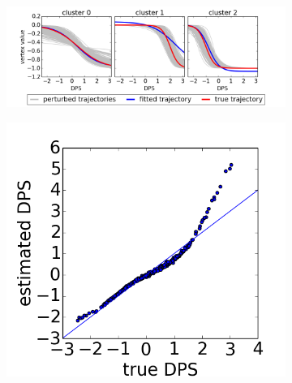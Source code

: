 \documentclass[8pt,xcolor=table]{beamer}
\begin{document}
\begin{frame}
\begin{figure}
\begin{subfigure}[b]{0.75\textwidth}
  \hspace{-1em}
  \includegraphics[width=1\textwidth]{figures/synThetaRes_gensigInitk-meansCl3Pr1Ra0_VWDPMStd.png}
  \caption{}
  \label{fig:synThetaRes}
\end{subfigure}
\hspace{-2em}
\begin{subfigure}[b]{0.24\textwidth}
\centering
  \includegraphics[width=1.1\textwidth]{figures/synShiftsRes_gensigInitk-meansCl3Pr1Ra0_VWDPMStd.png}
  \vspace{0.9em}
  \caption{}
  \label{fig:synShiftRes}
\end{subfigure}
\end{figure}
\end{frame}

\end{document}

